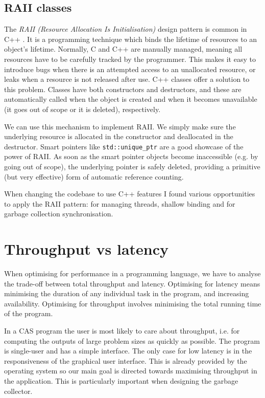 \subsection{RAII classes}
\label{sec:raii}
The \emph{RAII (Resource Allocation Is Initialisation)} design pattern is common in C++ \cite[Item~37]{effective-cpp}.
It is a programming technique which binds the lifetime of resources to an object's lifetime. Normally,
C and C++ are manually managed, meaning all resources have to be carefully tracked by the programmer.
This makes it easy to introduce bugs when there is an attempted access to an unallocated resource,
or leaks when a resource is not released after use. C++ classes offer a solution to this problem.
Classes have both constructors and destructors, and these are automatically called when the object
is created and when it becomes unavailable (it goes out of scope or it is deleted), respectively.

We can use this mechanism to implement RAII. We simply make sure
the underlying resource is allocated in the constructor and deallocated in the destructor.
Smart pointers like \verb|std::unique_ptr| are a good showcase of the power of RAII. As soon as the
smart pointer objects become inaccessible (e.g. by going out of scope), the underlying pointer
is safely deleted, providing a primitive (but very effective) form of automatic reference counting.

When changing the codebase to use C++ features I found various opportunities to apply the RAII pattern:
for managing threads, shallow binding and for garbage collection synchronisation.

\section{Throughput vs latency}
When optimising for performance in a programming language, we have to analyse the trade-off between
total throughput and latency. Optimising for latency means minimising the duration of any individual
task in the program, and increasing availability. Optimising for throughput involves minimising the
total running time of the program.

In a CAS program the user is most likely to care about throughput, i.e. for computing the outputs of large
problem sizes as quickly as possible. The program is single-user and has a simple interface. The only case
for low latency is in the responsiveness of the graphical user interface. This is already provided by the
operating system so our main goal is directed towards maximising throughput in the application.
This is particularly important when designing the garbage collector.

